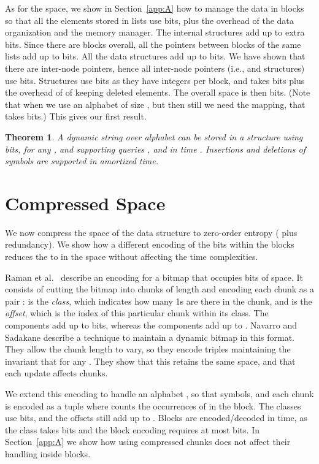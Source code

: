 \documentclass[11pt]{article}
\newtheorem{theorem}{Theorem}
\begin{document}
As for the space,
we show in Section~\ref{app:A} how to manage the data in blocks  
so that all the elements stored in lists  use  bits, plus
the overhead  of the data
organization and the memory manager.
The internal structures
 add up to  extra bits.
Since there are  blocks overall,
all the pointers between blocks of 
the same lists add up to  bits. 
All the data structures  add up to  bits. 
We have shown that there are
 inter-node pointers, hence all inter-node 
pointers (i.e.,  and  structures) use 
 bits. 
Structures  use 
bits as they have  integers per block, and  takes  bits
plus the overhead of  of keeping deleted elements.
The overall space is then 
 bits.
(Note that when  we use an alphabet of size , but then still
we need the  mapping, that takes  bits.)
This gives our first result.

\begin{theorem}
\label{thm:optimal}
A dynamic string  over alphabet  
can be stored in a structure using 
 bits,
for any ,
and supporting queries
,  and  in time .
Insertions and deletions of symbols 
are supported in  amortized time. 
\end{theorem}

\section{Compressed Space}
\label{sec:rrr}

We now compress the space of the data structure to
zero-order entropy ( plus redundancy).
We show how a different encoding of the bits within the blocks reduces
the  to  in the space without affecting the time
complexities. 

Raman et al.\ \cite{RRR07} describe an encoding for a bitmap  that
occupies  bits of space. It consists of
cutting the bitmap into chunks of length  and encoding each
chunk  as a pair :  is the {\em class}, which indicates how 
many 1s are there in the chunk, and  is the {\em offset}, which is the 
index of this particular chunk within its class. The  components add up to
 bits, whereas the  components add up to .
Navarro and Sadakane \cite[Sec.\ 8]{NS10} describe a technique to maintain a 
dynamic bitmap in this format. They allow the chunk length  to vary, so 
they encode triples  maintaining the invariant that 
 for any . They show that this retains the same space, 
and that each update affects  chunks.

We extend this encoding to handle an alphabet  
\cite{FMMN07}, so that  symbols, and each chunk is
encoded as a tuple  where  counts
the occurrences of  in the block. The classes
 use  bits, and
the offsets still add up to . Blocks are encoded/decoded in
 time, as the class takes  bits and
the block encoding requires at most  bits.
In Section~\ref{app:A} we show how using compressed chunks does not affect
their handling inside blocks.
\end{document}
